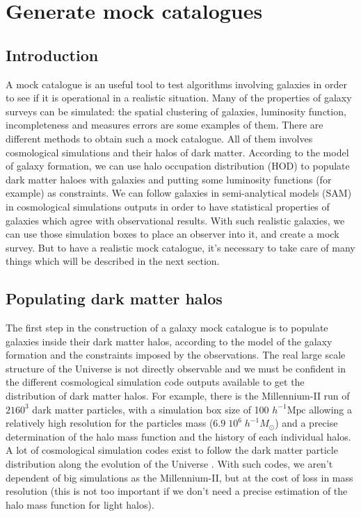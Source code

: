 \chapter{Generate mock catalogues}
\label{cha:mock}

\minitoc%

\section{Introduction}

A mock catalogue is an useful tool to test algorithms involving galaxies in
order to see if it is operational in a realistic situation. Many of the
properties of galaxy surveys can be simulated: the spatial clustering of
galaxies, luminosity function, incompleteness and measures errors are some
examples of them. There are different methods to obtain such a mock catalogue.
All of them involves cosmological simulations and their halos of dark matter.
According to the model of galaxy formation, we can use halo occupation
distribution (HOD) to populate dark matter haloes with galaxies and putting
some luminosity functions (for example) as constraints. We can follow galaxies
in semi-analytical models (SAM) in cosmological simulations outputs in order to
have statistical properties of galaxies which agree with observational results.
With such realistic galaxies, we can use those simulation boxes to place an
observer into it, and create a mock survey. But to have a realistic mock
catalogue, it's necessary to take care of many things which will be described
in the next section.

\section{Populating dark matter halos}
\label{sec:populating_dark_matter_halos}

The first step in the construction of a galaxy mock catalogue is to populate
galaxies inside their dark matter halos, according to the model of the galaxy
formation and the constraints imposed by the observations. The real large scale
structure of the Universe is not directly observable and we must be confident
in the different cosmological simulation code outputs available to get the
distribution of dark matter halos. For example, there is the Millennium-II run
\citep{BoylanKolchin+09} of $2160^3$ dark matter particles, with a simulation
box size of 100 $h^{-1} \mathrm{Mpc}$ allowing a relatively high resolution for
the particles mass ($6.9\;10^6\;h^{-1} M_\odot$) and a precise determination of
the halo mass function and the history of each individual halos. A lot of
cosmological simulation codes exist to follow the dark matter particle
distribution along the evolution of the Universe \citep{Springel+01,
Teyssier+02, Springel+05}. With such codes, we aren't dependent of big
simulations as the Millennium-II, but at the cost of loss in mass resolution
(this is not too important if we don't need a precise estimation of the halo
mass function for light halos).

